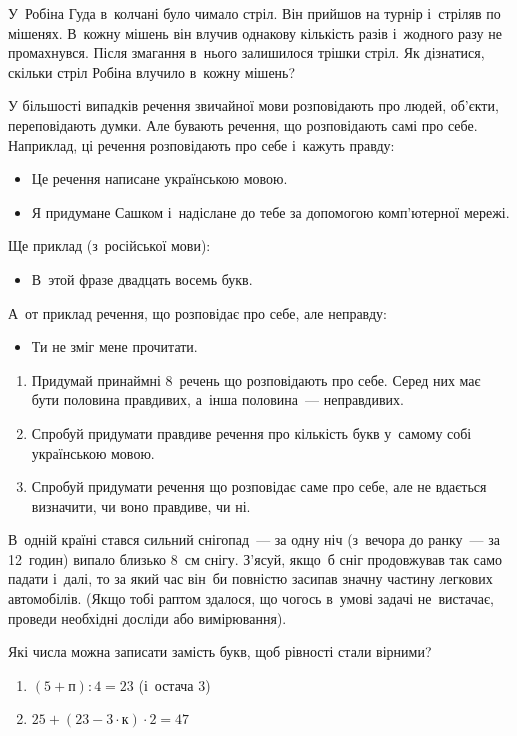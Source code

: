 \problem
У~Робіна Гуда в~колчані було чимало стріл.
Він прийшов на турнір і~стріляв по мішенях.
В~кожну мішень він влучив однакову кількість разів
і~жодного разу не промахнувся.
Після змагання в~нього залишилося трішки стріл.
Як дізнатися, скільки стріл Робіна влучило в~кожну мішень?


\problem
У більшості випадків речення звичайної мови розповідають про людей, об'єкти,
переповідають думки.
Але бувають речення, що розповідають самі про себе.
Наприклад, ці речення розповідають про себе і~кажуть правду:
\begin{itemize}
    \item Це речення написане українською мовою.
    \item Я придумане Сашком і~надіслане до тебе
    за допомогою комп’ютерної мережі.
\end{itemize}
Ще приклад (з~російської мови):
\begin{itemize}
    \item В~этой фразе двадцать восемь букв.
\end{itemize}
А~от приклад речення, що розповідає про себе, але неправду:
\begin{itemize}
    \item Ти не зміг мене прочитати.
\end{itemize}

\begin{enumerate}
    \item Придумай принаймні 8~речень що розповідають про себе.
    Серед них має бути половина правдивих, а~інша половина~--- неправдивих.
    \item Спробуй придумати правдиве речення про кількість букв
    у~самому собі українською мовою. 
    \item Спробуй придумати речення що розповідає саме про себе,
    але не вдається визначити, чи воно правдиве, чи ні.
\end{enumerate}


\problem
В~одній країні стався сильний снігопад~--- за одну ніч
(з~вечора до ранку~--- за 12~годин) випало близько 8~см снігу.
З'ясуй, якщо~б сніг продовжував так само падати і~далі,
то за який час він~би повністю засипав значну частину легкових автомобілів.
(Якщо тобі раптом здалося, що чогось в~умові задачі не~вистачає,
проведи необхідні досліди або вимірювання).


\problem
Які числа можна записати замість букв, щоб рівності стали вірними?
\begin{enumerate}
    \item $(5 + \textit{п}) : 4 = 23$ (і~остача 3)
    \item $25 + (23 - 3 \cdot \textit{к}) \cdot 2 = 47$
\end{enumerate}


